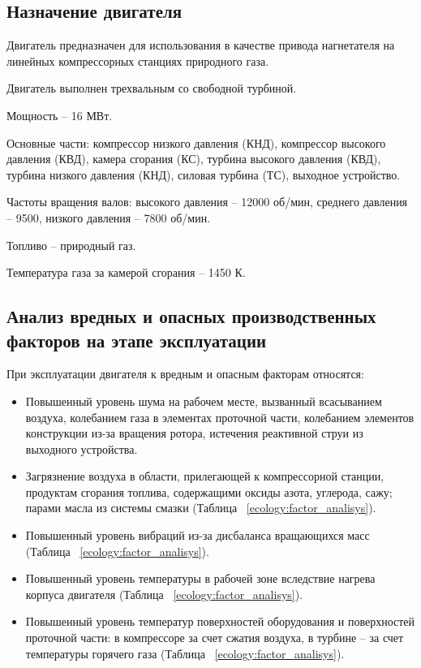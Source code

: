 \label{sec:ecology}

\subsection{Назначение двигателя}
\label{sub:ecology_engine_purpose}

Двигатель предназначен для использования в качестве привода нагнетателя на линейных компрессорных станциях природного газа.

Двигатель выполнен трехвальным со свободной турбиной.

Мощность – 16 МВт.

Основные части: компрессор низкого давления (КНД), компрессор высокого давления (КВД), камера сгорания (КС), турбина высокого давления (КВД), турбина низкого давления (КНД), силовая турбина (ТС), выходное устройство.

Частоты вращения валов: высокого давления – 12000 об/мин, среднего давления – 9500, низкого давления – 7800 об/мин.

Топливо – природный газ.

Температура газа за камерой сгорания – 1450 К.

\subsection{Анализ вредных и опасных производственных факторов на этапе эксплуатации} %
\label{sub:ecology_factor_analisys}

При эксплуатации двигателя к вредным и опасным факторам относятся:
\begin{itemize}
	\item Повышенный уровень шума на рабочем месте, вызванный всасыванием воздуха, колебанием газа в элементах проточной части, колебанием элементов конструкции из-за вращения ротора, истечения реактивной струи из выходного устройства.
	\item Загрязнение воздуха в области, прилегающей к компрессорной станции, продуктам сгорания топлива, содержащими оксиды азота, углерода, сажу; парами масла из системы смазки (Таблица ~\ref{ecology:factor_analisys}).
	\item Повышенный уровень вибраций из-за дисбаланса вращающихся масс (Таблица ~\ref{ecology:factor_analisys}).
	\item Повышенный уровень температуры в рабочей зоне вследствие нагрева корпуса двигателя (Таблица ~\ref{ecology:factor_analisys}).
	\item Повышенный уровень температур поверхностей оборудования и поверхностей проточной части: в компрессоре за счет сжатия воздуха, в турбине – за счет температуры горячего газа (Таблица ~\ref{ecology:factor_analisys}).
\end{itemize}

